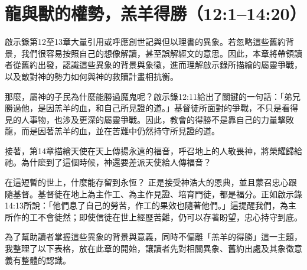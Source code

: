 \chapter{龍與獸的權勢，羔羊得勝（12:1–14:20）}

啟示錄第12至13章大量引用或呼應創世記與但以理書的異象。若忽略這些舊約背景，我們很容易按照自己的想像解讀，甚至誤解經文的意思。因此，本章將帶領讀者從舊約出發，認識這些異象的背景與象徵，進而理解啟示錄所描繪的屬靈爭戰，以及敵對神的勢力如何與神的救贖計畫相抗衡。

那麼，屬神的子民為什麼能勝過魔鬼呢？啟示錄12:11給出了關鍵的一句話：「弟兄勝過他，是因羔羊的血，和自己所見證的道。」基督徒所面對的爭戰，不只是看得見的人事物，也涉及更深的屬靈爭戰。因此，教會的得勝不是靠自己的力量擊敗龍，而是因著羔羊的血，並在苦難中仍然持守所見證的道。

接著，第14章描繪天使在天上傳揚永遠的福音，呼召地上的人敬畏神，將榮耀歸給祂。為什麽到了這個時候，神還要差派天使給人傳福音？

在這短暫的世上，什麼能存留到永恆？
正是接受神浩大的恩典，並且蒙召忠心跟隨基督。基督徒在地上為主作工、為主作見證、培育門徒，都是福分。正如啟示錄14:13所說：「他們息了自己的勞苦，作工的果效也隨著他們。」這提醒我們，為主所作的工不會徒然；即使信徒在世上經歷苦難，仍可以存著盼望，忠心持守到底。

為了幫助讀者掌握這些異象的背景與意義，同時不偏離「羔羊的得勝」這一主題，我整理了以下表格，放在此章的開始，讓讀者先對相關異象、舊約出處及其象徵意義有整體的認識。

